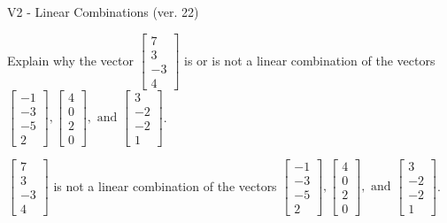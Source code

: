 \begin{exercise}
  \begin{exerciseTitle}V2 - Linear Combinations (ver. 22)\end{exerciseTitle}
  \begin{exerciseStatement}
    Explain why the vector \(\left[\begin{array}{c}
7 \\
3 \\
-3 \\
4
\end{array}\right]\)  is or is not a linear 
	combination of the vectors \(\left[\begin{array}{c}
-1 \\
-3 \\
-5 \\
2
\end{array}\right] , \left[\begin{array}{c}
4 \\
0 \\
2 \\
0
\end{array}\right] , \text{ and } \left[\begin{array}{c}
3 \\
-2 \\
-2 \\
1
\end{array}\right]\).
	


  \end{exerciseStatement}
  \begin{exerciseAnswer}
   \(\left[\begin{array}{c}
7 \\
3 \\
-3 \\
4
\end{array}\right]\) 
  	 is not  
	a linear combination of the vectors \(\left[\begin{array}{c}
-1 \\
-3 \\
-5 \\
2
\end{array}\right] , \left[\begin{array}{c}
4 \\
0 \\
2 \\
0
\end{array}\right] , \text{ and } \left[\begin{array}{c}
3 \\
-2 \\
-2 \\
1
\end{array}\right]\).

	
  


  \end{exerciseAnswer}
\end{exercise}
